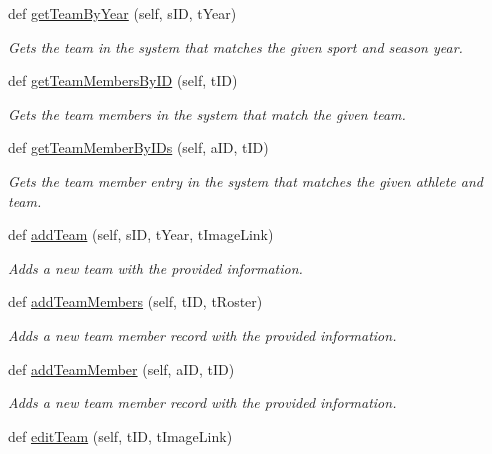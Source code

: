 \begin{DoxyCompactItemize}
def \hyperlink{classhandler_1_1team_1_1_team_handler_a4ee11f08a2e69e4a250527c9fea26190}{get\+Team\+By\+Year} (self, s\+ID, t\+Year)
\begin{DoxyCompactList}\small\item\em Gets the team in the system that matches the given sport and season year. \end{DoxyCompactList}\item 
def \hyperlink{classhandler_1_1team_1_1_team_handler_a01c7ec029ad084fb936ef9c90ef3a1c0}{get\+Team\+Members\+By\+ID} (self, t\+ID)
\begin{DoxyCompactList}\small\item\em Gets the team members in the system that match the given team. \end{DoxyCompactList}\item 
def \hyperlink{classhandler_1_1team_1_1_team_handler_a1a00f6d69828c15ce2da7b4215c868cf}{get\+Team\+Member\+By\+I\+Ds} (self, a\+ID, t\+ID)
\begin{DoxyCompactList}\small\item\em Gets the team member entry in the system that matches the given athlete and team. \end{DoxyCompactList}\item 
def \hyperlink{classhandler_1_1team_1_1_team_handler_a5210c4faddfd528492c3ce454a1aed95}{add\+Team} (self, s\+ID, t\+Year, t\+Image\+Link)
\begin{DoxyCompactList}\small\item\em Adds a new team with the provided information. \end{DoxyCompactList}\item 
def \hyperlink{classhandler_1_1team_1_1_team_handler_ae689082bd35b83e30cac03ad19d79ba5}{add\+Team\+Members} (self, t\+ID, t\+Roster)
\begin{DoxyCompactList}\small\item\em Adds a new team member record with the provided information. \end{DoxyCompactList}\item 
def \hyperlink{classhandler_1_1team_1_1_team_handler_a1f3809c59410d793a9b5db0de1a3b6b8}{add\+Team\+Member} (self, a\+ID, t\+ID)
\begin{DoxyCompactList}\small\item\em Adds a new team member record with the provided information. \end{DoxyCompactList}\item 
def \hyperlink{classhandler_1_1team_1_1_team_handler_a9fc42144b674bd9901dd1100cd8e389e}{edit\+Team} (self, t\+ID, t\+Image\+Link)

\end{DoxyCompactItemize}
